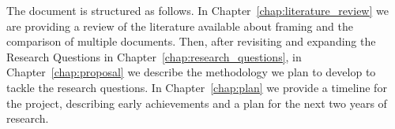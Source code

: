 







The document is structured as follows.
In Chapter~\ref{chap:literature_review} we are providing a review of the literature available about framing and the comparison of multiple documents.
Then, after revisiting and expanding the Research Questions in Chapter~\ref{chap:research_questions}, in Chapter~\ref{chap:proposal} we describe the methodology we plan to develop to tackle the research questions. %
In Chapter~\ref{chap:plan} we provide a timeline for the project, describing early achievements and a plan for the next two years of research.


